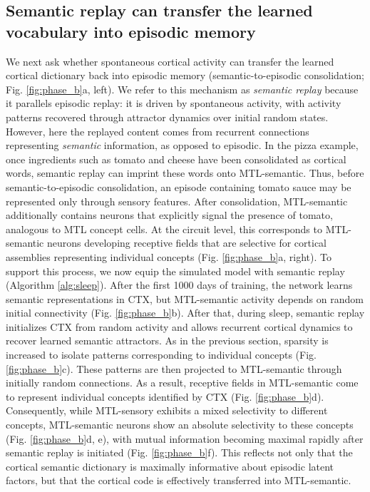 \documentclass{article}
\begin{document}
\subsection*{Semantic replay can transfer the learned vocabulary into episodic memory}
We next ask whether spontaneous cortical activity can transfer the learned cortical dictionary back into episodic memory (semantic-to-episodic consolidation; Fig. \ref{fig:phase_b}a, left). We refer to this mechanism as \textit{semantic replay} because it parallels episodic replay: it is driven by spontaneous activity, with activity patterns recovered through attractor dynamics over initial random states. However, here the replayed content comes from recurrent connections representing \textit{semantic} information, as opposed to episodic. In the pizza example, once ingredients such as tomato and cheese have been consolidated as cortical words, semantic replay can imprint these words onto MTL-semantic. Thus, before semantic-to-episodic consolidation, an episode containing tomato sauce may be represented only through sensory features. After consolidation, MTL-semantic additionally contains neurons that explicitly signal the presence of tomato, analogous to MTL concept cells. At the circuit level, this corresponds to MTL-semantic neurons developing receptive fields that are selective for cortical assemblies representing individual concepts (Fig. \ref{fig:phase_b}a, right).
\newline\newline
To support this process, we now equip the simulated model with semantic replay (Algorithm \ref{alg:sleep}). After the first 1000 days of training, the network learns semantic representations in CTX, but MTL-semantic activity depends on random initial connectivity (Fig. \ref{fig:phase_b}b). After that, during sleep, semantic replay initializes CTX from random activity and allows recurrent cortical dynamics to recover learned semantic attractors. As in the previous section, sparsity is increased to isolate patterns corresponding to individual concepts (Fig. \ref{fig:phase_b}c). These patterns are then projected to MTL-semantic through initially random connections. As a result, receptive fields in MTL-semantic come to represent individual concepts identified by CTX (Fig. \ref{fig:phase_b}d). Consequently, while MTL-sensory exhibits a mixed selectivity to different concepts, MTL-semantic neurons show an absolute selectivity to these concepts (Fig. \ref{fig:phase_b}d, e), with mutual information becoming maximal rapidly after semantic replay is initiated (Fig. \ref{fig:phase_b}f). This reflects not only that the cortical semantic dictionary is maximally informative about episodic latent factors, but that the cortical code is effectively transferred into MTL-semantic.
\end{document}
